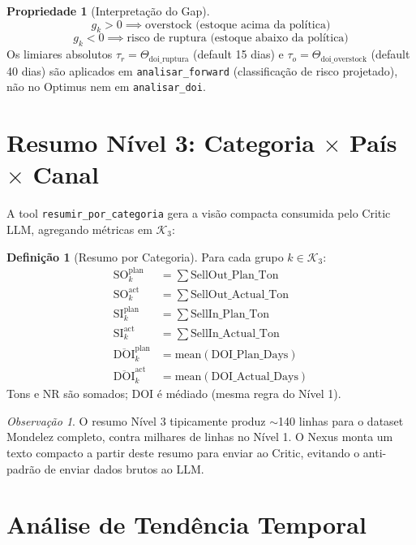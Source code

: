 \documentclass[a4paper, 12pt]{report}
\theoremstyle{definition}
\newtheorem{definicao}{Defini\c{c}\~ao}[chapter]
\newtheorem{propriedade}{Propriedade}[chapter]
\theoremstyle{remark}
\newtheorem{observacao}{Observa\c{c}\~ao}[chapter]
\begin{document}
\begin{propriedade}[Interpreta\c{c}\~ao do Gap]
  \[
    g_k > 0 \implies \text{overstock (estoque acima da pol\'itica)}
  \]
  \[
    g_k < 0 \implies \text{risco de ruptura (estoque abaixo da pol\'itica)}
  \]
  Os limiares absolutos $\tau_r = \Theta_{\text{doi\_ruptura}}$ (default 15 dias)
  e $\tau_o = \Theta_{\text{doi\_overstock}}$ (default 40 dias) s\~ao
  aplicados em \texttt{analisar\_forward} (classifica\c{c}\~ao de risco
  projetado), n\~ao no Optimus nem em \texttt{analisar\_doi}.
\end{propriedade}


\section{Resumo N\'ivel 3: Categoria $\times$ Pa\'is $\times$ Canal}

A tool \texttt{resumir\_por\_categoria} gera a vis\~ao compacta consumida
pelo Critic LLM, agregando m\'etricas em $\mathcal{K}_3$:

\begin{definicao}[Resumo por Categoria]
  Para cada grupo $k \in \mathcal{K}_3$:
  \begin{align*}
    \text{SO}^{\text{plan}}_k &= \sum \text{SellOut\_Plan\_Ton} \\
    \text{SO}^{\text{act}}_k  &= \sum \text{SellOut\_Actual\_Ton} \\
    \text{SI}^{\text{plan}}_k &= \sum \text{SellIn\_Plan\_Ton} \\
    \text{SI}^{\text{act}}_k  &= \sum \text{SellIn\_Actual\_Ton} \\
    \overline{\text{DOI}}^{\text{plan}}_k &= \text{mean}(\text{DOI\_Plan\_Days}) \\
    \overline{\text{DOI}}^{\text{act}}_k  &= \text{mean}(\text{DOI\_Actual\_Days})
  \end{align*}
  Tons e NR s\~ao somados; DOI \'e m\'ediado (mesma regra do N\'ivel 1).
\end{definicao}

\begin{observacao}
  O resumo N\'ivel 3 tipicamente produz $\sim$140 linhas para o dataset
  Mondelez completo, contra milhares de linhas no N\'ivel 1. O Nexus monta
  um texto compacto a partir deste resumo para enviar ao Critic,
  evitando o anti-padr\~ao de enviar dados brutos ao LLM.
\end{observacao}


\section{An\'alise de Tend\^encia Temporal}
\end{document}
